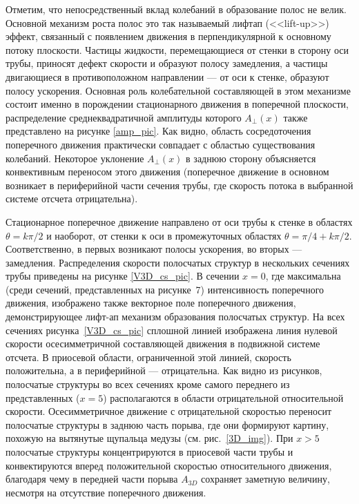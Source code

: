 Отметим, что непосредственный вклад колебаний в образование полос не велик. Основной механизм роста полос это так называемый лифтап (<<lift-up>>) эффект, связанный с появлением движения в перпендикулярной к основному потоку плоскости. Частицы жидкости, перемещающиеся от стенки в сторону оси трубы, приносят дефект скорости и образуют полосу замедления, а частицы двигающиеся в противоположном направлении --- от оси к стенке, образуют полосу ускорения. Основная роль колебательной составляющей в этом механизме состоит именно в порождении стационарного движения в поперечной плоскости, распределение среднеквадратичной амплитуды которого $A_\bot(x)$ также представлено на рисунке \ref{amp_pic}. Как видно, область сосредоточения поперечного движения практически совпадает с областью существования колебаний. Некоторое уклонение $A_\bot(x)$ в заднюю сторону объясняется конвективным переносом этого движения (поперечное движение в основном возникает в периферийной части сечения трубы, где скорость потока в выбранной системе отсчета отрицательна).

Стационарное поперечное движение направлено от оси трубы к стенке в областях $\theta=k\pi/2$ и наоборот, от стенки к оси в промежуточных областях $\theta=\pi/4+k\pi/2$. Соответственно, в первых возникают полосы ускорения, во вторых --- замедления. Распределения скорости полосчатых структур в нескольких сечениях трубы приведены на рисунке \ref{V3D_cs_pic}. В сечении $x=0$, где максимальна (среди сечений, представленных на рисунке~7) интенсивность поперечного движения, изображено также векторное поле поперечного движения, демонстрирующее лифт-ап механизм образования полосчатых структур. На всех сечениях рисунка~\ref{V3D_cs_pic} сплошной линией изображена линия нулевой скорости осесимметричной составляющей движения в подвижной системе отсчета. В приосевой области, ограниченной этой линией, скорость положительна, а в периферийной --- отрицательна. Как видно из рисунков, полосчатые структуры во всех сечениях кроме самого переднего из представленных ($x=5$) располагаются в области отрицательной относительной скорости. Осесимметричное движение с отрицательной скоростью переносит полосчатые структуры в заднюю часть порыва, где они формируют картину, похожую на вытянутые щупальца медузы (см. рис.~\ref{3D_img}). При $x>5$ полосчатые структуры концентрируются в приосевой части трубы и конвектируются вперед положительной скоростью относительного движения, благодаря чему в передней части порыва $A_{3D}$ сохраняет заметную величину, несмотря на отсутствие поперечного движения.


